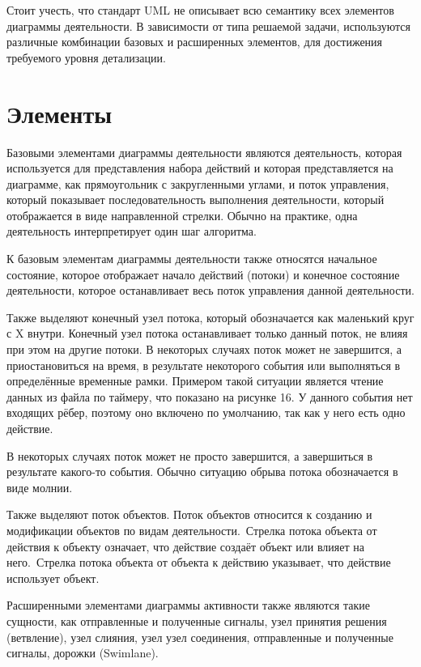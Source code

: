 Стоит учесть, что стандарт UML не описывает всю семантику всех элементов диаграммы деятельности. В зависимости от типа решаемой задачи, используются различные комбинации базовых и расширенных элементов, для достижения требуемого уровня детализации.  

\section{Элементы}

Базовыми элементами диаграммы деятельности являются деятельность, которая используется для представления набора действий и которая представляется на диаграмме, как прямоугольник с закругленными углами, и поток управления, который показывает последовательность выполнения деятельности, который отображается в виде направленной стрелки. Обычно на практике, одна деятельность интерпретирует один шаг алгоритма.

К базовым элементам диаграммы деятельности также относятся начальное состояние, которое отображает начало действий (потоки) и конечное состояние деятельности, которое останавливает весь поток управления данной деятельности.

Также выделяют конечный узел потока, который обозначается как маленький круг с X внутри. Конечный узел потока останавливает только данный поток, не влияя при этом на другие потоки. В некоторых случаях поток может не завершится, а приостановиться на время, в результате некоторого события или выполняться в определённые временные рамки. Примером такой ситуации является чтение данных из файла по таймеру, что показано на рисунке 16. У данного события нет входящих рёбер, поэтому оно включено по умолчанию, так как у него есть одно действие.

В некоторых случаях поток может не просто завершится, а завершиться в результате какого-то события. Обычно ситуацию обрыва потока обозначается в виде молнии.


Также выделяют поток объектов. Поток объектов относится к созданию и модификации объектов по видам деятельности. Стрелка потока объекта от действия к объекту означает, что действие создаёт объект или влияет на него. Стрелка потока объекта от объекта к действию указывает, что действие использует объект.


Расширенными элементами диаграммы активности также являются такие сущности, как отправленные и полученные сигналы, узел принятия решения (ветвление), узел слияния, узел узел соединения, отправленные и полученные сигналы, дорожки (Swimlane).

